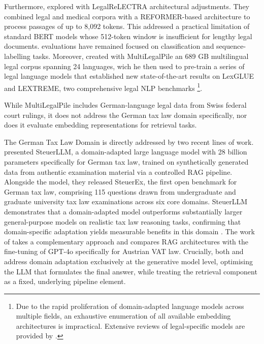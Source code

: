 Furthermore, \citet{hua2022legalrelectra} explored with LegalReLECTRA architectural adjustments. They combined legal and medical corpora with a REFORMER-based architecture to process passages of up to 8,092 tokens. This addressed a practical limitation of standard \ac{BERT} models whose 512-token window is insufficient for lengthy legal documents. evaluations have remained focused on classification and sequence-labelling tasks. Moreover, \citet{niklaus_2024_multilegalpile} created with MultiLegalPile an 689 GB multilingual legal corpus spanning 24 languages, wich he then used to pre-train a series of legal language models that established new state-of-the-art results on LexGLUE and LEXTREME, two comprehensive legal \ac{NLP} benchmarks \cite{niklaus_2024_multilegalpile,chalkidis_2022_lexglue, niklaus_2023_lextreme}\footnote{Due to the rapid proliferation of domain-adapted language models across multiple fields, an exhaustive enumeration of all available embedding architectures is impractical. Extensive reviews of legal-specific models are provided by \citet{chalkidis_2022_lexglue}.}.

While MultiLegalPile includes German-language legal data from Swiss federal court rulings, it does not address the German tax law domain specifically, nor does it evaluate embedding representations for retrieval tasks.

The German Tax Law Domain is directly addressed by two recent lines of work. \citet{wind2026steuerllm} presented SteuerLLM, a domain-adapted large language model with 28 billion parameters specifically for German tax law, trained on synthetically generated data from authentic examination material via a controlled \ac{RAG} pipeline. Alongside the model, they released SteuerEx, the first open benchmark for German tax law, comprising 115 questions drawn from undergraduate and graduate university tax law examinations across six core domains. SteuerLLM demonstrates that a domain-adapted model outperforms substantially larger general-purpose models on realistic tax law reasoning tasks, confirming that domain-specific adaptation yields measurable benefits in this domain \cite{wind2026steuerllm}. The work of \citet{luketina2025using} takes a complementary approach and compares \ac{RAG} architectures with the fine-tuning of GPT-4o specifically for Austrian VAT law. Crucially, both \citet{wind2026steuerllm} and \citet{luketina2025using} address domain adaptation exclusively at the generative model level, optimising the \ac{LLM} that formulates the final answer, while treating the retrieval component as a fixed, underlying pipeline element. 
